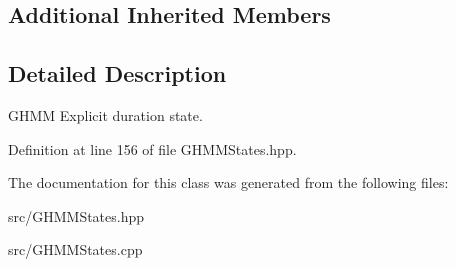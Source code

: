 \subsection*{Additional Inherited Members}


\subsection{Detailed Description}
G\+H\+MM Explicit duration state. 

Definition at line 156 of file G\+H\+M\+M\+States.\+hpp.



The documentation for this class was generated from the following files\+:\begin{DoxyCompactItemize}
\item 
src/G\+H\+M\+M\+States.\+hpp\item 
src/G\+H\+M\+M\+States.\+cpp\end{DoxyCompactItemize}
